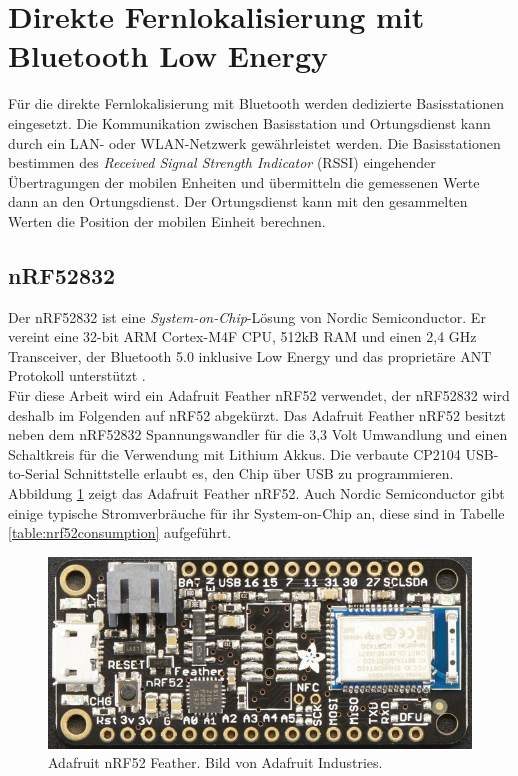 \section{Direkte Fernlokalisierung mit Bluetooth Low Energy}
\label{ch:phase3}
Für die direkte Fernlokalisierung mit Bluetooth werden dedizierte Basisstationen eingesetzt. 
Die Kommunikation zwischen Basisstation und Ortungsdienst kann durch ein LAN- oder WLAN-Netzwerk gewährleistet werden.
Die Basisstationen bestimmen des \emph{Received Signal Strength Indicator} (RSSI) eingehender Übertragungen der mobilen Enheiten und übermitteln die gemessenen Werte dann an den Ortungsdienst.
Der Ortungsdienst kann mit den gesammelten Werten die Position der mobilen Einheit berechnen.

\subsection{nRF52832}
Der nRF52832 ist eine \emph{System-on-Chip}-Lösung von Nordic Semiconductor.
Er vereint eine 32-bit ARM Cortex-M4F CPU, 512kB RAM und einen 2,4 GHz Transceiver, der Bluetooth 5.0 inklusive Low Energy und das proprietäre ANT Protokoll unterstützt \cite{nordic2017nrf}.\\
Für diese Arbeit wird ein Adafruit Feather nRF52 verwendet, der nRF52832 wird deshalb im Folgenden auf nRF52 abgekürzt.
Das Adafruit Feather nRF52 besitzt neben dem nRF52832 Spannungswandler für die 3,3 Volt Umwandlung und einen Schaltkreis für die Verwendung mit Lithium Akkus. 
Die verbaute CP2104 USB-to-Serial Schnittstelle erlaubt es, den Chip über USB zu programmieren.\\
Abbildung \ref{fig:nrf52layout} zeigt das Adafruit Feather nRF52.
Auch Nordic Semiconductor gibt einige typische Stromverbräuche für ihr System-on-Chip an, diese sind in Tabelle \ref{table:nrf52consumption} aufgeführt.

\begin{figure}[h]
  \centering
	\includegraphics[width=\textwidth]{images/nrf52ada.png}
  \caption{Adafruit nRF52 Feather. Bild von Adafruit Industries\protect \footnotemark.}
  \label{fig:nrf52layout}
\end{figure}

